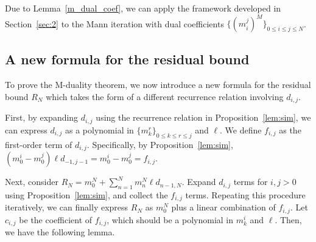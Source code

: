 \documentclass[pdflatex,sn-mathphys-num]{sn-jnl}%
\theoremstyle{thmstyleone}%
\theoremstyle{thmstyletwo}%
\theoremstyle{thmstylethree}%
\newtheorem{lemma}{Lemma}%
\begin{document}
Due to Lemma~\ref{m_dual_coef}, we can apply the framework developed in Section~\ref{sec:2} to the Mann iteration with dual coefficients $\{(m_i^j)^M\}_{0\le i \le j\le N}$.

\subsection{A new formula for the residual bound}

To prove the M-duality theorem, we now introduce a new formula
for the residual bound $R_N$ which takes the form of a different recurrence relation
involving $d_{i,j}$.

First, by expanding $d_{i,j}$ using the recurrence relation in
Proposition~\ref{lem:sim}, we can express $d_{i,j}$ as a polynomial in
$\{m_k^r\}_{0\le k\le r\le j}$ and $\ell$. We define $f_{i,j}$ as the first-order
term of $d_{i,j}$. Specifically, by Proposition~\ref{lem:sim}, $(m_0^i-m_0^j)\ell d_{-1,j-1}=m_0^i-m_0^j=f_{i,j}$.

Next, consider $R_N=m_0^N+\sum_{n=1}^N m_n^N\ell d_{n-1,N}$. Expand $d_{i,j}$ terms for $i,j>0$ using Proposition~\ref{lem:sim}, and collect the $f_{i,j}$ terms. 
Repeating this procedure iteratively, we can finally express $R_N$ as $m^N_0$ plus a linear combination of $f_{i,j}$. Let $c_{i,j}$ be the coefficient of $f_{i,j}$, which should be a polynomial in $m_k^i$ and $\ell$.  Then, we have the following lemma.
\end{document}
